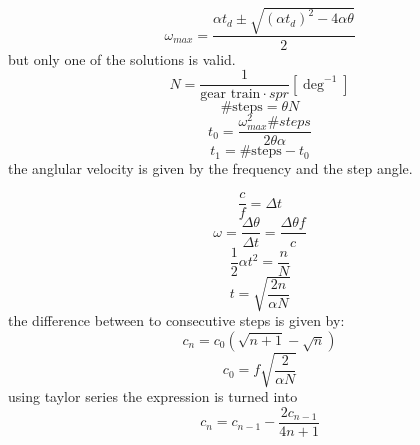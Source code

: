 \documentclass{article}
\begin{document}
    \begin{equation}
      \omega_{max}= \frac{\alpha t_d \pm \sqrt{(\alpha t_d)^2 - 4 \alpha \theta}}{2}
    \end{equation}
    but only one of the solutions is valid. 
    \begin{equation}
       N= \frac{1}{\text{gear train} \cdot spr} [\deg^{-1}]
    \end{equation}
    \begin{equation}
         \#\text{steps} = \theta N 
    \end{equation}
    \begin{equation}
       t_0 = \frac{\omega_{max}^2\#steps}{2\theta\alpha}
    \end{equation}
    \begin{equation}
       t_1 = \#\text{steps} - t_0
    \end{equation}
    the anglular velocity is given by the frequency and the step angle. 

    \begin{equation}
       \frac{c}{f} = \Delta t
    \end{equation}
    \begin{equation}
       \omega = \frac{\Delta \theta}{\Delta t} = \frac{\Delta \theta f}{c}
    \end{equation}
    \begin{equation}
       \frac{1}{2}\alpha t^2 = \frac{n}{N}
    \end{equation}
    \begin{equation}
       t = \sqrt{\frac{2n}{\alpha N}}
    \end{equation}
    the difference between to consecutive steps is given by:
    \begin{equation}
      c_n = c_0(\sqrt{n+1}-\sqrt{n})
    \end{equation}
    \begin{equation}
       c_0 = f \sqrt{\frac{2}{\alpha N}}
    \end{equation}
    using taylor series the expression is turned into 
    \begin{equation}
       c_n = c_{n-1} - \frac{2c_{n-1}}{4n+1}
    \end{equation}
    
\end{document}
